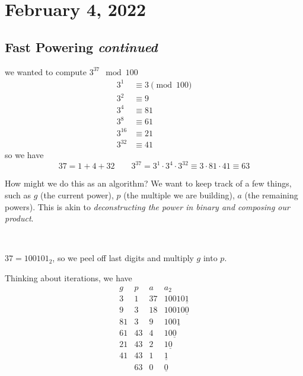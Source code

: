 \section{February 4, 2022}
\subsection{Fast Powering \emph{continued}}
\begin{example}
    \recall we wanted to compute $3^{37}\mod 100$
    \begin{align*}
        3^1    & \equiv 3\pmod{100} \\
        3^2    & \equiv 9           \\
        3^4    & \equiv 81          \\
        3^8    & \equiv 61          \\
        3^{16} & \equiv 21          \\
        3^{32} & \equiv 41
    \end{align*}
    so we have
    \[37=1+4+32 \qquad 3^{37} = 3^1\cdot 3^4\cdot 3^{32} \equiv 3\cdot 81\cdot 41\equiv 63\]
\end{example}
How might we do this as an algorithm? We want to keep track of a few things, such as $g$ (the current power), $p$ (the multiple we are building), $a$ (the remaining powers). This is akin to \emph{deconstructing the power in binary and composing our product}.

\begin{algorithm}
    ~
\end{algorithm}

\begin{example}
    $37=100101_2$, so we peel off last digits and multiply $g$ into $p$.

    Thinking about iterations, we have
    \[\begin{array}{llll}
            g  & p          & a  & a_2                \\ \hline
            3  & 1          & 37 & 10010\underline{1} \\
            9  & 3          & 18 & 10010\underline{0} \\
            81 & 3          & 9  & 100\underline{1}   \\
            61 & 43         & 4  & 10\underline{0}    \\
            21 & 43         & 2  & 1\underline{0}     \\
            41 & 43         & 1  & \underline{1}      \\
               & \boxed{63} & 0  & \underline{0}
        \end{array}\]
\end{example}


